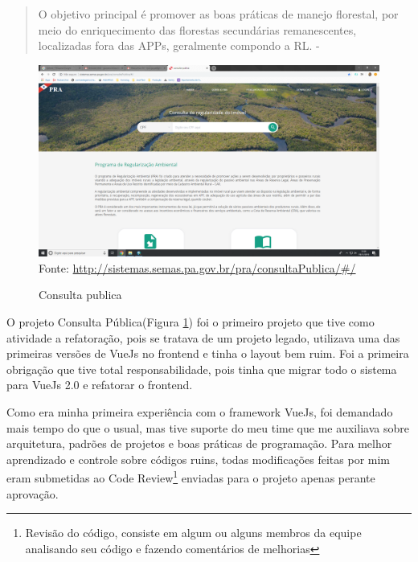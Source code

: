 \begin{quote}
    O objetivo principal é promover as boas
    práticas de manejo florestal, por meio do enriquecimento das florestas secundárias
    remanescentes, localizadas fora das APPs, geralmente compondo a RL. - \cite{de2015cadastro}
\end{quote}
\begin{figure}[H]
\centering
\caption{Consulta publica} %
\includegraphics[scale=0.22]{consulta-publica}\\  %
{\small Fonte: \url{http://sistemas.semas.pa.gov.br/pra/consultaPublica/#/}} %
\label{fig:consultaPublica} %
\end{figure}

O projeto Consulta Pública(Figura \ref{fig:consultaPublica}) foi o primeiro projeto que tive como atividade a refatoração, pois se tratava de um projeto legado, utilizava uma das primeiras versões de VueJs no frontend e tinha o layout bem ruim.
Foi a primeira obrigação que tive total responsabilidade, pois tinha que migrar todo o sistema para VueJs 2.0 e refatorar o frontend.

Como era minha primeira experiência com o framework VueJs, foi demandado mais tempo do que o usual, mas tive suporte do meu time que me auxiliava sobre arquitetura, padrões de projetos e boas práticas de programação.
Para melhor aprendizado e controle sobre códigos ruins, todas modificações feitas por mim eram submetidas ao Code Review\footnote{Revisão do código, consiste em algum ou alguns membros da equipe analisando seu código e fazendo comentários de melhorias} enviadas para o projeto apenas perante aprovação. 

